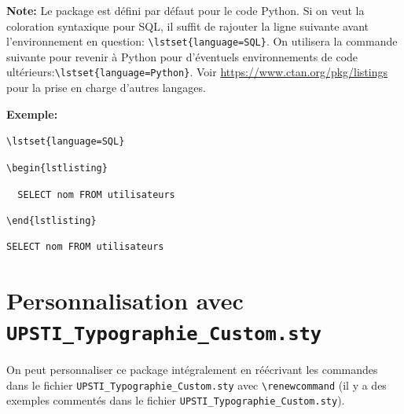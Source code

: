 \documentclass[11pt]{ltxdockit}[2010/09/26]
\newcommand{\ex}{\noindent \textbf{Exemple:}\quad}
\begin{document}
\textbf{Note:} Le package est défini par défaut pour le code Python. Si on veut la coloration syntaxique pour SQL, il suffit de rajouter la ligne suivante avant l'environnement en question: \verb!\lstset{language=SQL}!. On utilisera la commande suivante pour revenir à Python pour d'éventuels environnements de code ultérieurs:\linebreak \verb!\lstset{language=Python}!. Voir \url{https://www.ctan.org/pkg/listings} pour la prise en charge d'autres langages.

\ex

\verb!\lstset{language=SQL}!

\verb!\begin{lstlisting}!

\verb!  SELECT nom FROM utilisateurs !

\verb!\end{lstlisting}!

\lstset{language=SQL}
\begin{lstlisting}
SELECT nom FROM utilisateurs
\end{lstlisting}


\section{Personnalisation avec \texttt{UPSTI\_Typographie\_Custom.sty}\label{custom}}
On peut personnaliser ce package intégralement en réécrivant les commandes  dans le fichier \texttt{UPSTI\_Typographie\_Custom.sty} avec \verb!\renewcommand! (il y a des exemples commentés dans le fichier \texttt{UPSTI\_Typographie\_Custom.sty}).
\end{document}
